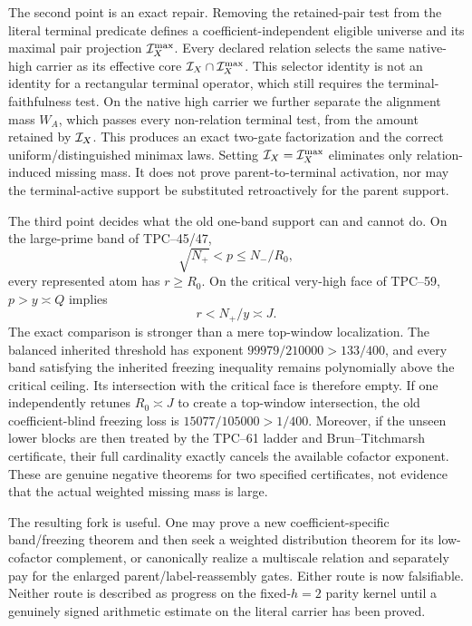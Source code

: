 The second point is an exact repair.  Removing the retained-pair test from
the literal terminal predicate defines a coefficient-independent eligible
universe and its maximal pair projection \(\mathcal I_X^{\max}\).  Every declared
relation selects the same native-high carrier as its effective core
\(\mathcal I_X\cap\mathcal I_X^{\max}\).  This selector identity is not an identity for a
rectangular terminal operator, which still requires the terminal-faithfulness
test.  On the native high carrier we further separate
the alignment mass \(W_A\), which passes every non-relation terminal test,
from the amount retained by \(\mathcal I_X\).  This produces an exact two-gate
factorization and the correct uniform/distinguished minimax laws.  Setting
\(\mathcal I_X=\mathcal I_X^{\max}\) eliminates only relation-induced missing mass.  It
does not prove parent-to-terminal activation, nor may the terminal-active
support be substituted retroactively for the parent support.

The third point decides what the old one-band support can and cannot do.
On the large-prime band of TPC--45/47,
\begin{equation}
 \sqrt{N_+}<p\le N_-/R_0,
 \label{eq:intro-old-prime-band}
\end{equation}
every represented atom has \(r\ge R_0\).  On the critical very-high face
of TPC--59, \(p>y\asymp Q\) implies
\begin{equation}
 r<N_+/y\asymp J.
 \label{eq:intro-critical-cofactor-ceiling}
\end{equation}
The exact comparison is stronger than a mere top-window localization.  The
balanced inherited threshold has exponent \(99979/210000>133/400\), and
every band satisfying the inherited freezing inequality remains
polynomially above the critical ceiling.  Its intersection with the
critical face is therefore empty.  If one independently retunes
\(R_0\asymp J\) to create a top-window intersection, the old
coefficient-blind freezing loss is \(15077/105000>1/400\).  Moreover, if
the unseen lower blocks are then treated by the TPC--61 ladder and
Brun--Titchmarsh certificate, their full cardinality exactly cancels the
available cofactor exponent.  These are genuine negative theorems for two
specified certificates, not evidence that the actual weighted missing
mass is large.

The resulting fork is useful.  One may prove a new coefficient-specific
band/freezing theorem and then seek a weighted distribution theorem for
its low-cofactor complement, or canonically realize a multiscale relation
and separately pay for the enlarged parent/label-reassembly gates.  Either
route is now falsifiable.
Neither route is described as progress on the fixed-\(h=2\) parity kernel
until a genuinely signed arithmetic estimate on the literal carrier has
been proved.

